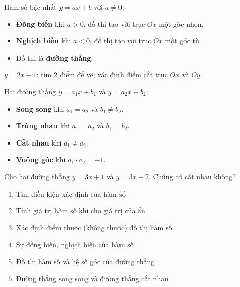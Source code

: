 \documentclass[12pt,a4paper]{article}
\begin{document}
\begin{tinhchat}
  Hàm số bậc nhất $y = ax + b$ với $a \neq 0$:
  \begin{itemize}
    \item \textbf{Đồng biến} khi $a > 0$, đồ thị tạo với trục $Ox$ một góc nhọn.
    \item \textbf{Nghịch biến} khi $a < 0$, đồ thị tạo với trục $Ox$ một góc tù.
    \item Đồ thị là \textbf{đường thẳng}.
  \end{itemize}
\end{tinhchat}

\begin{vidu}
  $y = 2x - 1$: tìm 2 điểm để vẽ; xác định điểm cắt trục $Ox$ và $Oy$.
\end{vidu}

\begin{tinhchat}[title={Vị trí tương đối của hai đường thẳng}]
  Hai đường thẳng $y = a_1 x + b_1$ và $y = a_2 x + b_2$:
  \begin{itemize}
    \item \textbf{Song song} khi $a_1 = a_2$ và $b_1 \neq b_2$.
    \item \textbf{Trùng nhau} khi $a_1 = a_2$ và $b_1 = b_2$.
    \item \textbf{Cắt nhau} khi $a_1 \neq a_2$.
    \item \textbf{Vuông góc} khi $a_1 \cdot a_2 = -1$.
  \end{itemize}
\end{tinhchat}

\begin{vidu}
  Cho hai đường thẳng $y = 3x + 1$ và $y = 3x - 2$. Chúng có cắt nhau không?
\end{vidu}

\begin{enumerate}[label=\textbf{Dạng \arabic*:}, leftmargin=*, align=left]
  \item Tìm điều kiện xác định của hàm số
  \item Tính giá trị hàm số khi cho giá trị của ẩn
  \item Xác định điểm thuộc (không thuộc) đồ thị hàm số
  \item Sự đồng biến, nghịch biến của hàm số
  \item Đồ thị hàm số và hệ số góc của đường thẳng
  \item Đường thẳng song song và đường thẳng cắt nhau
\end{enumerate}

\end{document}
